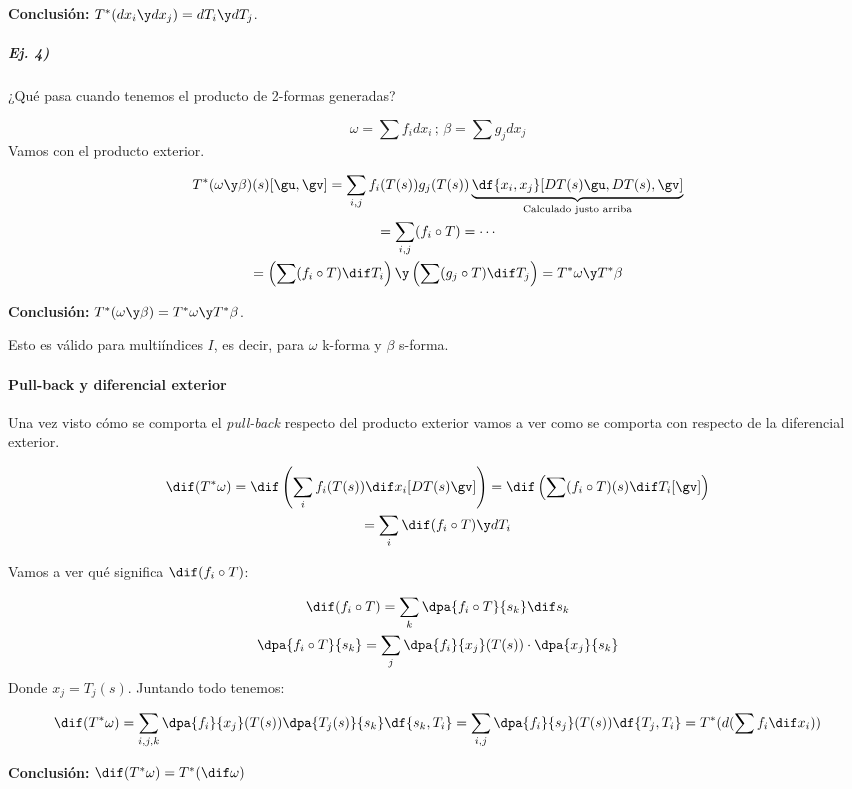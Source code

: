 \textbf{Conclusión: } $T^{\ast} (dx_i \y dx_j) = dT_i \y dT_j$.

\subparagraph{Ej. 4)} ¿Qué pasa cuando tenemos el producto de 2-formas generadas?

\[\omega = \sum f_idx_i\,;\,\beta=\sum g_jdx_j\]
Vamos con el producto exterior.

\begin{gather*}
T^{\ast} (\omega \y \beta) (s) [\gu,\gv] = \sum_{i,j} f_i(T(s))g_j(T(s)) \underbrace{\df{x_i,x_j} [DT(s)\gu, DT(s),\gv]}_{\text{Calculado justo arriba}}\\
= \sum_{i,j} (f_i\circ T) = \dotsb \\
= \left(\sum (f_i\circ T)\dif T_i\right)\y\left(\sum(g_j \circ T) \dif T_j\right) = T^{\ast}\omega \y T^{\ast}\beta
\end{gather*}

\textbf{Conclusión: } $T^{\ast}(\omega \y \beta) = T^{\ast}\omega \y T^{\ast}\beta$. 

Esto es válido para multiíndices $I$, es decir, para $\omega$ k-forma y $\beta$ s-forma.


\paragraph{Pull-back y diferencial exterior}
Una vez visto cómo se comporta el \emph{pull-back} respecto del producto exterior vamos a ver como se comporta con respecto de la diferencial exterior.

\begin{gather*}
\dif (T^{\ast} \omega) = \dif \left(\sum_i f_i(T(s)) \dif x_i [DT(s)\gv]\right) = \dif\left(\sum (f_i \circ T)(s) \dif T_i[\gv]\right)\\
= \sum_i \dif(f_i\circ T)\y dT_i
\end{gather*}

Vamos a ver qué significa $\dif(f_i\circ T)$:

\begin{gather*}
\dif (f_i\circ T) =  \sum_k \dpa{f_i\circ T}{s_k} \dif s_k \\
\dpa{f_i\circ T}{s_k} = \sum_j \dpa{f_i}{x_j}(T(s))\cdot \dpa{x_j}{s_k}
\end{gather*}
Donde $x_j = T_j(s)$. Juntando todo tenemos: 

\[ 
\dif (T^{\ast} \omega) = \sum_{i,j,k} \dpa{f_i}{x_j}(T(s)) \dpa{T_j(s)}{s_k} \df{s_k,T_i} = \sum_{i,j} \dpa{f_i}{s_j}(T(s)) \df{T_j,T_i} = T^{\ast}(d(\sum f_i \dif x_i))
\]
 
 \textbf{Conclusión: } $\dif (T^{\ast}\omega) = T^{\ast}(\dif \omega)$
 
